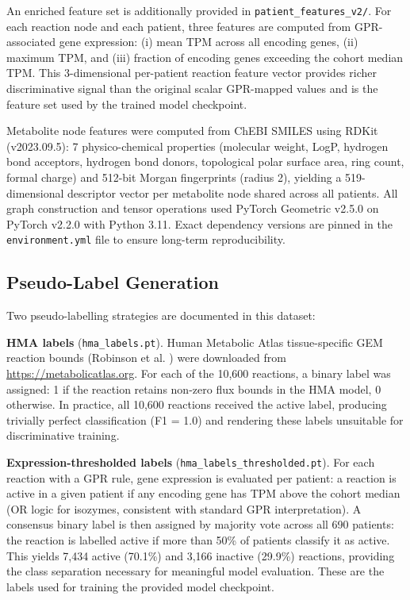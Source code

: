 \documentclass[12pt,a4paper]{article}
\begin{document}
An enriched feature set is additionally provided in \texttt{patient\_features\_v2/}. For each reaction node and each patient, three features are computed from GPR-associated gene expression: (i) mean TPM across all encoding genes, (ii) maximum TPM, and (iii) fraction of encoding genes exceeding the cohort median TPM. This 3-dimensional per-patient reaction feature vector provides richer discriminative signal than the original scalar GPR-mapped values and is the feature set used by the trained model checkpoint.

Metabolite node features were computed from ChEBI SMILES using RDKit (v2023.09.5): 7 physico-chemical properties (molecular weight, LogP, hydrogen bond acceptors, hydrogen bond donors, topological polar surface area, ring count, formal charge) and 512-bit Morgan fingerprints (radius 2), yielding a 519-dimensional descriptor vector per metabolite node shared across all patients. All graph construction and tensor operations used PyTorch Geometric \cite{Fey2019} v2.5.0 on PyTorch v2.2.0 with Python 3.11. Exact dependency versions are pinned in the \texttt{environment.yml} file to ensure long-term reproducibility.

\subsection{Pseudo-Label Generation}

Two pseudo-labelling strategies are documented in this dataset:

\textbf{HMA labels} (\texttt{hma\_labels.pt}). Human Metabolic Atlas tissue-specific GEM reaction bounds (Robinson et al. \cite{Robinson2020}) were downloaded from \url{https://metabolicatlas.org}. For each of the 10,600 reactions, a binary label was assigned: 1 if the reaction retains non-zero flux bounds in the HMA model, 0 otherwise. In practice, all 10,600 reactions received the active label, producing trivially perfect classification (F1 = 1.0) and rendering these labels unsuitable for discriminative training.

\textbf{Expression-thresholded labels} (\texttt{hma\_labels\_thresholded.pt}). For each reaction with a GPR rule, gene expression is evaluated per patient: a reaction is active in a given patient if any encoding gene has TPM above the cohort median (OR logic for isozymes, consistent with standard GPR interpretation). A consensus binary label is then assigned by majority vote across all 690 patients: the reaction is labelled active if more than 50\% of patients classify it as active. This yields 7,434 active (70.1\%) and 3,166 inactive (29.9\%) reactions, providing the class separation necessary for meaningful model evaluation. These are the labels used for training the provided model checkpoint.
\end{document}
